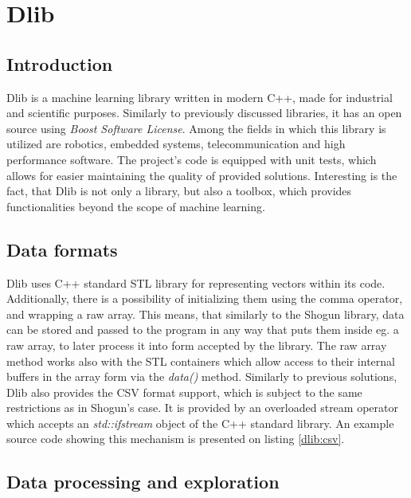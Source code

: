 \chapter{Dlib}

\section{Introduction}

Dlib is a machine learning library written in modern C++, made for industrial and scientific purposes\cite{Dlib09}. Similarly to previously discussed libraries, it has an open source using \textit{Boost Software License}\cite{dlib:license}. Among the fields in which this library is utilized are robotics, embedded systems, telecommunication and high performance software. The project's code is equipped with unit tests, which allows for easier maintaining the quality of provided solutions. Interesting is the fact, that Dlib is not only a library, but also a toolbox, which provides functionalities beyond the scope of machine learning.

\section{Data formats}

Dlib uses C++ standard STL library for representing vectors within its code. Additionally, there is a possibility of initializing them using the comma operator, and wrapping a raw array. This means, that similarly to the Shogun library, data can be stored and passed to the program in any way that puts them inside eg. a raw array, to later process it into form accepted by the library. The raw array method works also with the STL containers which allow access to their internal buffers in the array form via the \textit{data()} method. Similarly to previous solutions, Dlib also provides the CSV format support, which is subject to the same restrictions as in Shogun's case. It is provided by an overloaded stream operator which accepts an \textit{std::ifstream} object of the C++ standard library. An example source code showing this mechanism is presented on listing \ref{dlib:csv}.


\section{Data processing and exploration}

